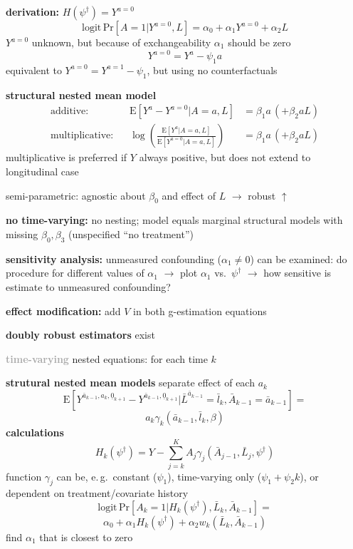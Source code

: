 \documentclass[8pt,twoside]{extarticle}
\begin{document}
\begin{multicols}{2}
\noindent \textbf{derivation:} $H(\psi^\dagger) = Y^{a=0}$
$$\mathrm{logit} \, \mathrm{Pr}\left[A=1|Y^{a=0}, L\right] = \alpha_0 + \alpha_1Y^{a=0} + \alpha_2L$$
$Y^{a=0}$ unknown, but because of exchangeability $\alpha_1$ should be zero
$$Y^{a=0} =Y^a - \psi_1 a$$
equivalent to $Y^{a=0} =Y^{a=1} - \psi_1$, but using no counterfactuals



\noindent \textbf{structural nested mean model}
\begin{align*}
\text{additive: }\,\,\, & \mathrm{E}\left[Y^a-Y^{a=0}|A=a, L\right] &= \beta_1 a \,(+ \beta_2 a L) \\
\text{multiplicative: }\,\,\, & \log \left( \frac{\mathrm{E}\left[Y^a|A=a, L\right]}{\mathrm{E}\left[Y^{a=0}|A=a, L\right]} \right) &= \beta_1 a \,(+ \beta_2 a L)
\end{align*} 
multiplicative is preferred if $Y$ always positive, but does not extend to longitudinal case

\noindent semi-parametric: agnostic about $\beta_0$ and effect of $L$ $\rightarrow$ robust $\uparrow$

\noindent \textbf{no time-varying:} no nesting; model equals marginal structural models with missing $\beta_0, \beta_3$ (unspecified ``no treatment'')

\noindent \textbf{sensitivity analysis:} unmeasured confounding ($\alpha_1 \neq 0$) can be examined: do procedure  for different values of $\alpha_1$ $\rightarrow$ plot $\alpha_1$ vs.\ $\psi^\dagger$ $\rightarrow$ how sensitive is  estimate to unmeasured confounding?

\noindent \textbf{effect modification:} add $V$ in both g-estimation equations %


\noindent \textbf{doubly robust estimators} exist%

\vspace{0.2em}
\noindent \colorbox{lightgray!20!white}{\begin{minipage}{28em}
\textbf{\textcolor{darkgray}{time-varying}}
 nested equations: for each time $k$

\noindent \textbf{strutural nested mean models} separate effect of each $a_k$
$$\mathrm{E}\left[Y^{\bar{a}_{k-1}, a_k, \underline{0}_{k+1}} - Y^{\bar{a}_{k-1}, \underline{0}_{k+1}}|\bar{L}^{\bar{a}_{k-1}}=\bar{l}_k, \bar{A}_{k-1} = \bar{a}_{k-1}\right] = $$
$$  a_k\gamma_k\left(\bar{a}_{k-1}, \bar{l}_k,\beta\right)$$
\noindent \textbf{calculations}
$$H_k\left(\psi^\dagger\right) = Y - \sum_{j=k}^K A_j \gamma_j\left(\bar{A}_{j-1}, \bar{L}_j, \psi^\dagger\right)$$
\noindent function $\gamma_j$ can be, e.\,g.\ constant ($\psi_1$), time-varying only ($\psi_1+\psi_2k$), or dependent on treatment/covariate history
$$\mathrm{logit}\,\mathrm{Pr}\left[A_k=1|H_k\left(\psi^\dagger\right), \bar{L}_k,\bar{A}_{k-1}\right]=$$
$$\alpha_0 +\alpha_1H_k\left(\psi^\dagger\right)+\alpha_2 w_k\left(\bar{L}_k,\bar{A}_{k-1}\right)
$$
find $\alpha_1$ that is closest to zero


\end{minipage}}
\end{multicols}
\end{document}
